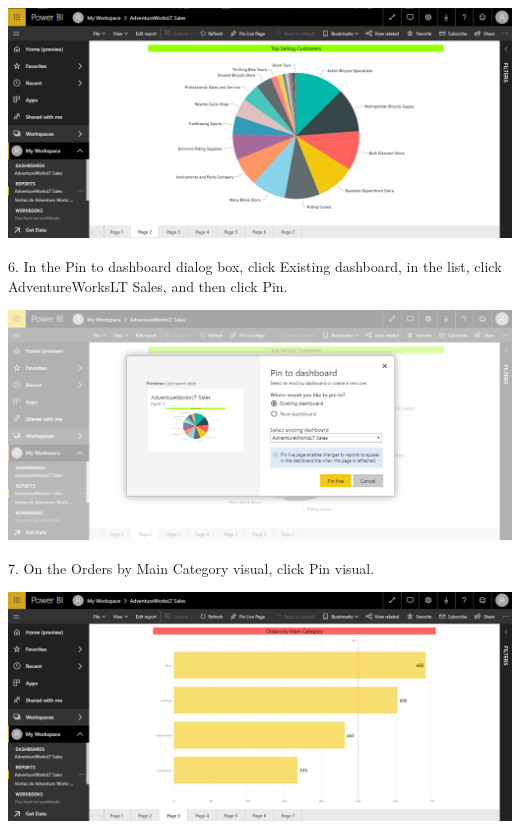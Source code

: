 	\begin{center}
	\includegraphics[width=17cm]{./Imagenes/Ejercicio3/Tarea2/3}
	\end{center}	

6. In the Pin to dashboard dialog box, click Existing dashboard, in the list, click AdventureWorksLT
Sales, and then click Pin.\\

	\begin{center}
	\includegraphics[width=17cm]{./Imagenes/Ejercicio3/Tarea2/4}
	\end{center}	

7. On the Orders by Main Category visual, click Pin visual.\\

	\begin{center}
	\includegraphics[width=17cm]{./Imagenes/Ejercicio3/Tarea2/5}
	\end{center}	

